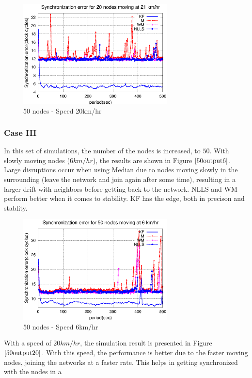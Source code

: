 \documentclass[a4paper,10pt]{report}
\begin{document}
\begin{figure}
\centering
\includegraphics[width=0.7\textwidth]{16output-s20}
\caption{50 nodes - Speed 20km/hr} \label{16output20}
\end{figure}
\subsubsection{\textbf{Case III}}
In this set of simulations, the number of the nodes is increased, to $50$. With slowly moving nodes ($6km/hr$), the results are shown in Figure $\ref{50output6}$. Large disruptions occur when using Median due to nodes moving slowly in the surrounding (leave the network and join again after some time), resulting in a larger drift with neighbors before getting back to the network. NLLS and WM perform better when it comes to stability. KF has the edge, both in precison and stablity. 
\newline
\begin{figure}
\centering
\includegraphics[width=0.7\textwidth]{50output-s6}
\caption{50 nodes - Speed 6km/hr} \label{50output6}
\end{figure}
With a speed of $20km/hr$, the simulation result is presented in Figure $\ref{50output20}$. With this speed, the performance is
better due to the faster moving nodes, joining the networks at a faster rate. This helps in getting synchronized with the nodes in a
\end{document}
